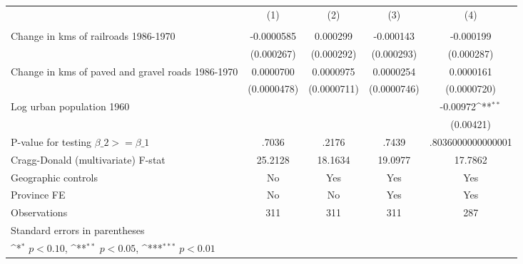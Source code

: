 {
\def\sym#1{\ifmmode^{#1}\else\(^{#1}\)\fi}
\begin{tabular}{l*{4}{c}}
\hline\hline
                &\multicolumn{1}{c}{(1)}&\multicolumn{1}{c}{(2)}&\multicolumn{1}{c}{(3)}&\multicolumn{1}{c}{(4)}\\
                &\multicolumn{1}{c}{}&\multicolumn{1}{c}{}&\multicolumn{1}{c}{}&\multicolumn{1}{c}{}\\
\hline
Change in kms of railroads 1986-1970&-0.0000585         & 0.000299         &-0.000143         &-0.000199         \\
                &(0.000267)         &(0.000292)         &(0.000293)         &(0.000287)         \\
[1em]
Change in kms of paved and gravel roads 1986-1970&0.0000700         &0.0000975         &0.0000254         &0.0000161         \\
                &(0.0000478)         &(0.0000711)         &(0.0000746)         &(0.0000720)         \\
[1em]
Log urban population 1960&                  &                  &                  & -0.00972\sym{**} \\
                &                  &                  &                  &(0.00421)         \\
\hline
P-value for testing $\beta\_{2} >= \beta\_{1}$&    .7036         &    .2176         &    .7439         &.8036000000000001         \\
Cragg-Donald (multivariate) F-stat&  25.2128         &  18.1634         &  19.0977         &  17.7862         \\
Geographic controls&       No         &      Yes         &      Yes         &      Yes         \\
Province FE     &       No         &       No         &      Yes         &      Yes         \\
Observations    &      311         &      311         &      311         &      287         \\
\hline\hline
\multicolumn{5}{l}{\footnotesize Standard errors in parentheses}\\
\multicolumn{5}{l}{\footnotesize \sym{*} \(p<0.10\), \sym{**} \(p<0.05\), \sym{***} \(p<0.01\)}\\
\end{tabular}
}

